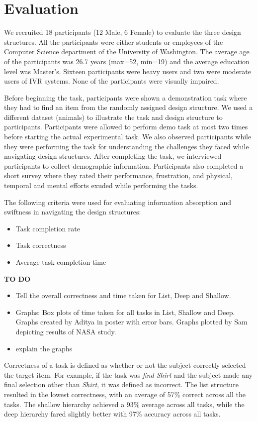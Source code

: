 \documentclass{sigchi}
\begin{document}
\section{Evaluation}
We recruited 18 participants (12 Male, 6 Female) to evaluate the three design structures. All the participants were either students or employees of the Computer Science department of the University of Washington. The average age of the participants was 26.7 years (max=52, min=19) and the average education level was Master's. Sixteen participants were heavy users and two were moderate users of IVR systems. None of the participants were visually impaired. 

Before beginning the task, participants were shown a demonstration task where they had to find an item from the randomly assigned design structure. We used a different dataset (animals) to illustrate the task and design structure to participants. Participants were allowed to perform demo task at most two times before starting the actual experimental task. We also observed participants while they were performing the task for understanding the challenges they faced while navigating design structures. After completing the task, we interviewed participants to collect demographic information. Participants also completed a short survey where they rated their performance, frustration, and physical, temporal and mental efforts exuded while performing the tasks. 

The following criteria were used for evaluating information absorption and swiftness in navigating the design structures:
\begin{itemize}
\item Task completion rate
\item Task correctness
\item Average task completion time
\end{itemize}

\textbf{TO DO}
\begin{itemize}
\item Tell the overall correctness and time taken for List, Deep and Shallow. 
\item Graphs: Box plots of time taken for all tasks in List, Shallow and Deep. Graphs created by Aditya in poster with error bars. Graphs plotted by Sam depicting results of NASA study. 
\item explain the graphs
\end{itemize}

Correctness of a task is defined as whether or not the subject correctly selected the target item. For example, if the task was \textit{find Shirt} and the subject made any final selection other than \textit{Shirt}, it was defined as incorrect. The list structure resulted in the lowest correctness, with an average of 57\% correct across all the tasks. The shallow hierarchy achieved a 93\% average across all tasks, while the deep hierarchy fared slightly better with 97\% accuracy across all tasks.
\end{document}
